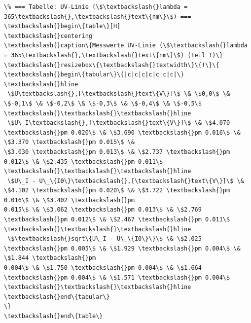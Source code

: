     \begin{Verbatim}[commandchars=\\\{\}]
\% === Tabelle: UV-Linie (\$\textbackslash{}lambda = 365\textbackslash{},\textbackslash{}text\{nm\}\$) ===
\textbackslash{}begin\{table\}[H]
\textbackslash{}centering
\textbackslash{}caption\{Messwerte UV-Linie (\$\textbackslash{}lambda = 365\textbackslash{},\textbackslash{}text\{nm\}\$) (Teil 1)\}
\textbackslash{}resizebox\{\textbackslash{}textwidth\}\{!\}\{
\textbackslash{}begin\{tabular\}\{|c|c|c|c|c|c|c|\}
\textbackslash{}hline
 \$U\textbackslash{},[\textbackslash{}text\{V\}]\$ \& \$0,0\$ \& \$-0,1\$ \& \$-0,2\$ \& \$-0,3\$ \& \$-0,4\$ \& \$-0,5\$ \textbackslash{}\textbackslash{}\textbackslash{}hline
 \$U\_I\textbackslash{},[\textbackslash{}text\{V\}]\$ \& \$4.070 \textbackslash{}pm 0.020\$ \& \$3.690 \textbackslash{}pm 0.016\$ \& \$3.370 \textbackslash{}pm 0.015\$ \&
\$3.030 \textbackslash{}pm 0.013\$ \& \$2.737 \textbackslash{}pm 0.012\$ \& \$2.435 \textbackslash{}pm 0.011\$ \textbackslash{}\textbackslash{}\textbackslash{}hline
 \$U\_I - U\_\{I0\}\textbackslash{},[\textbackslash{}text\{V\}]\$ \& \$4.102 \textbackslash{}pm 0.020\$ \& \$3.722 \textbackslash{}pm 0.016\$ \& \$3.402 \textbackslash{}pm
0.015\$ \& \$3.062 \textbackslash{}pm 0.013\$ \& \$2.769 \textbackslash{}pm 0.012\$ \& \$2.467 \textbackslash{}pm 0.011\$ \textbackslash{}\textbackslash{}\textbackslash{}hline
 \$\textbackslash{}sqrt\{U\_I - U\_\{I0\}\}\$ \& \$2.025 \textbackslash{}pm 0.005\$ \& \$1.929 \textbackslash{}pm 0.004\$ \& \$1.844 \textbackslash{}pm
0.004\$ \& \$1.750 \textbackslash{}pm 0.004\$ \& \$1.664 \textbackslash{}pm 0.004\$ \& \$1.571 \textbackslash{}pm 0.004\$ \textbackslash{}\textbackslash{}\textbackslash{}hline
\textbackslash{}end\{tabular\}
\}
\textbackslash{}end\{table\}


\end{Verbatim}
